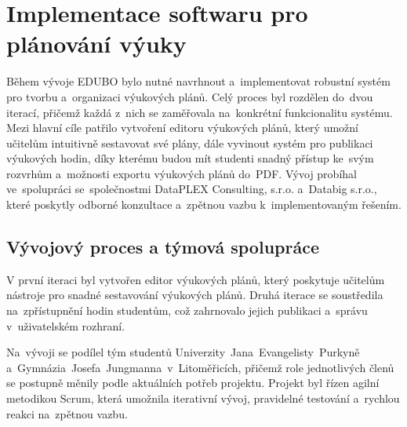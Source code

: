 \documentclass[male,czech,api_bc]{kitheses}
\begin{document}
\section{Implementace softwaru pro plánování výuky}

Během vývoje EDUBO bylo nutné navrhnout a~implementovat robustní systém pro tvorbu a~organizaci výukových plánů. Celý proces byl rozdělen do~dvou iterací, přičemž každá z~nich se zaměřovala na~konkrétní funkcionalitu systému. Mezi hlavní cíle patřilo vytvoření editoru výukových plánů, který umožní učitelům intuitivně sestavovat své plány, dále vyvinout systém pro publikaci výukových hodin, díky kterému budou mít studenti snadný přístup ke~svým rozvrhům a~možnosti exportu výukových plánů do~PDF. Vývoj probíhal ve~spolupráci se~společnostmi DataPLEX Consulting, s.r.o. a~Databig s.r.o., které poskytly odborné konzultace a~zpětnou vazbu k~implementovaným řešením.

\subsection{Vývojový proces a týmová spolupráce}

V první iteraci byl vytvořen editor výukových plánů, který poskytuje učitelům nástroje pro snadné sestavování výukových plánů. Druhá iterace se soustředila na~zpřístupnění hodin studentům, což zahrnovalo jejich publikaci a~správu v~uživatelském rozhraní.

Na~vývoji se podílel tým studentů Univerzity~Jana~Evangelisty~Purkyně a~Gymnázia~Josefa~Jungmanna~v~Litoměřicích, přičemž role jednotlivých členů se postupně měnily podle aktuálních potřeb projektu. Projekt byl řízen agilní metodikou Scrum, která umožnila iterativní vývoj, pravidelné testování a~rychlou reakci na~zpětnou vazbu.
\end{document}
